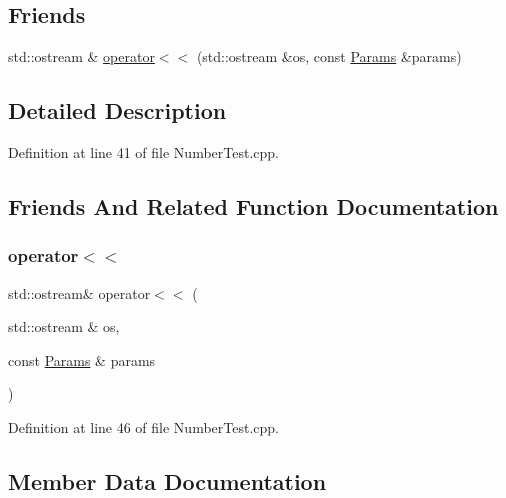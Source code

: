 \subsection*{Friends}
\begin{DoxyCompactItemize}
\item 
std\+::ostream \& \hyperlink{struct_params_ada7517152e144e49a36dd29a92ed8eb6}{operator$<$$<$} (std\+::ostream \&os, const \hyperlink{struct_params}{Params} \&params)
\end{DoxyCompactItemize}


\subsection{Detailed Description}


Definition at line 41 of file Number\+Test.\+cpp.



\subsection{Friends And Related Function Documentation}
\mbox{\label{struct_params_ada7517152e144e49a36dd29a92ed8eb6}} 
\subsubsection{\texorpdfstring{operator$<$$<$}{operator<<}}
{\footnotesize\ttfamily std\+::ostream\& operator$<$$<$ (\begin{DoxyParamCaption}\item[{std\+::ostream \&}]{os,  }\item[{const \hyperlink{struct_params}{Params} \&}]{params }\end{DoxyParamCaption})\hspace{0.3cm}{\ttfamily [friend]}}



Definition at line 46 of file Number\+Test.\+cpp.



\subsection{Member Data Documentation}
\mbox{\label{struct_params_ac15c821d1c46c6d5571f3ee32ba0fdbb}} 
